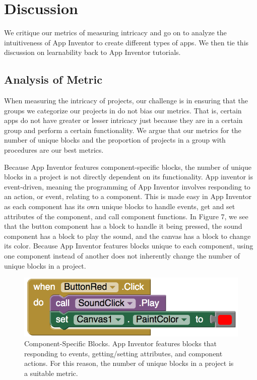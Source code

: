 \documentclass[conference]{IEEEtran}
\begin{document}
\section{Discussion}
We critique our metrics of measuring intricacy and go on to analyze the intuitiveness of App Inventor to create different types of apps. We then tie this discussion on learnability back to App Inventor tutorials.

\subsection{Analysis of Metric}
When measuring the intricacy of projects, our challenge is in ensuring that the groups we categorize our projects in do not bias our metrics. That is, certain apps do not have greater or lesser intricacy just because they are in a certain group and perform a certain functionality. We argue that our metrics for the number of unique blocks and the proportion of projects in a group with procedures are our best metrics.

Because App Inventor features component-specific blocks, the number of unique blocks in a project is not directly dependent on its functionality. App inventor is event-driven, meaning the programming of App Inventor involves responding to an action, or event, relating to a component. This is made easy in App Inventor as each component has its own unique blocks to handle events, get and set attributes of the component, and call component functions. In Figure 7, we see that the button component has a block to handle it being pressed, the sound component has a block to play the sound, and the canvas has a block to change its color. Because App Inventor features blocks unique to each component, using one component instead of another does not inherently change the number of unique blocks in a project.

\begin{figure}[h!]
	\centering
	\includegraphics[width=1\linewidth]{component_blocks.png}
	\caption{Component-Specific Blocks. App Inventor features blocks that responding to events, getting/setting attributes, and component actions. For this reason, the number of unique blocks in a project is a suitable metric.}
	\label{component_specific_blocks}
\end{figure}
\end{document}
